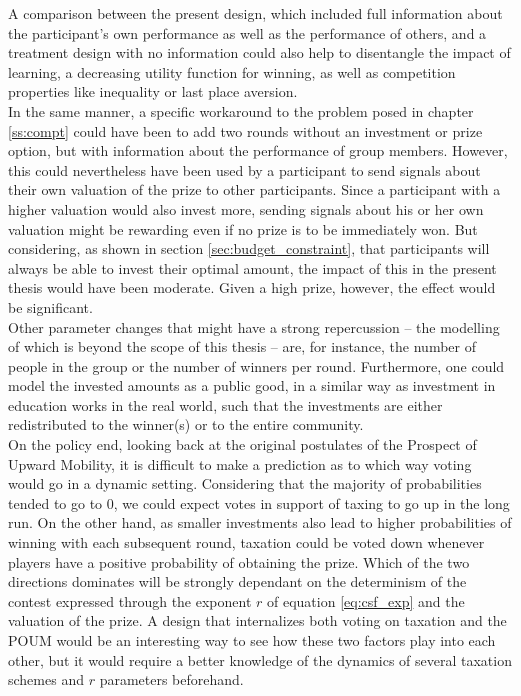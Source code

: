 A comparison between the present design, which included full information about the participant's own performance as well as the performance of others, and a treatment design with no information could also help to disentangle the impact of learning, a decreasing utility function for winning, as well as competition properties like inequality or last place aversion.\\

In the same manner, a specific workaround to the problem posed in chapter \ref{ss:compt} could have been to add two rounds without an investment or prize option, but with information about the performance of group members. However, this could nevertheless have been used by a participant to send signals about their own valuation of the prize to other participants. Since a participant with a higher valuation would also invest more, sending signals about his or her own valuation might be rewarding even if no prize is to be immediately won. But considering, as shown in section \ref{sec:budget_constraint}, that participants will always be able to invest their optimal amount, the impact of this in the present thesis would have been moderate. Given a high prize, however, the effect would be significant.\\

Other parameter changes that might have a strong repercussion -- the modelling of which is beyond the scope of this thesis -- are, for instance, the number of people in the group or the number of winners per round. Furthermore, one could model the invested amounts as a public good, in a similar way as investment in education works in the real world, such that the investments are either redistributed to the winner(s) or to the entire community.\\

On the policy end, looking back at the original postulates of the Prospect of Upward Mobility, it is difficult to make a prediction as to which way voting would go in a dynamic setting. Considering that the majority of probabilities tended to go to 0, we could expect votes in support of taxing to go up in the long run. On the other hand, as smaller investments also lead to higher probabilities of winning with each subsequent round, taxation could be voted down whenever players have a positive probability of obtaining the prize. Which of the two directions dominates will be strongly dependant on the determinism of the contest expressed through the exponent $r$ of equation \ref{eq:csf_exp} and the valuation of the prize. A design that internalizes both voting on taxation and the POUM would be an interesting way to see how these two factors play into each other, but it would require a better knowledge of the dynamics of several taxation schemes and $r$ parameters beforehand.\\

